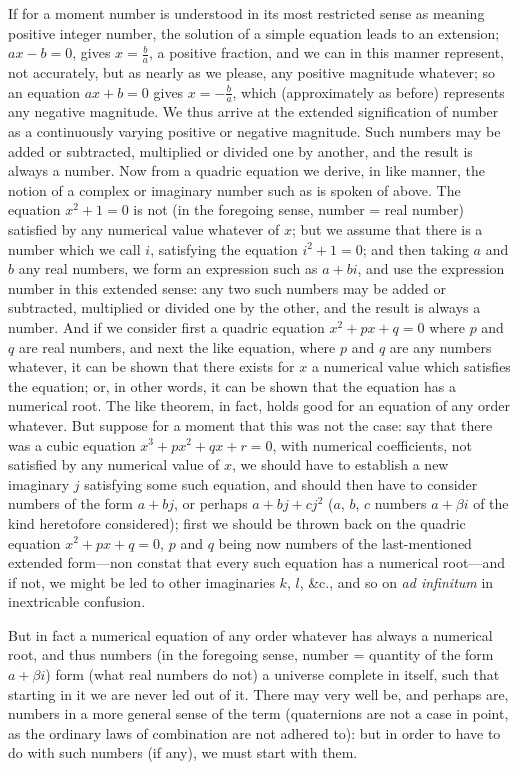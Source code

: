 \documentclass[11pt,a4paper]{book}
\begin{document}
If for a moment number is understood in its most restricted sense as meaning positive integer number, the solution of a simple equation leads to an extension; $ax - b = 0$, gives $x = \frac{b}{a}$, a positive fraction, and we can in this manner represent, not accurately, but as nearly as we please, any positive magnitude whatever; so an equation $ax + b = 0$ gives $x = -\frac{b}{a}$, which (approximately as before) represents any negative magnitude. We thus arrive at the extended signification of number as a continuously varying positive or negative magnitude. Such numbers may be added or subtracted, multiplied or divided one by another, and the result is always a number. Now from a quadric equation we derive, in like manner, the notion of a complex or imaginary number such as is spoken of above. The equation $x^{2} + 1 = 0$ is not (in the foregoing sense, number = real number) satisfied by any numerical value whatever of $x$; but we assume that there is a number which we call $i$, satisfying the equation $i^{2} + 1 = 0$; and then taking $a$ and $b$ any real numbers, we form an expression such as $a + bi$, and use the expression number in this extended sense: any two such numbers may be added or subtracted, multiplied or divided one by the other, and the result is always a number. And if we consider first a quadric equation $x^{2} + px + q = 0$ where $p$ and $q$ are real numbers, and next the like equation, where $p$ and $q$ are any numbers whatever, it can be shown that there exists for $x$ a numerical value which satisfies the equation; or, in other words, it can be shown that the equation has a numerical root. The like theorem, in fact, holds good for an equation of any order whatever. But suppose for a moment that this was not the case: say that there was a cubic equation $x^{3} + px^{2} + qx + r = 0$, with numerical coefficients, not satisfied by any numerical value of $x$, we should have to establish a new imaginary $j$ satisfying some such equation, and should then have to consider numbers of the form $a + bj$, or perhaps $a + bj + cj^{2}$ ($a$, $b$, $c$ numbers $a + \beta i$ of the kind heretofore considered); first we should be thrown back on the quadric equation $x^{2} + px + q = 0$, $p$ and $q$ being now numbers of the last-mentioned extended form---non constat that every such equation has a numerical root---and if not, we might be led to other imaginaries $k$, $l$, \&c., and so on \textit{ad infinitum} in inextricable confusion.

But in fact a numerical equation of any order whatever has always a numerical root, and thus numbers (in the foregoing sense, number = quantity of the form $a + \beta i$) form (what real numbers do not) a universe complete in itself, such that starting in it we are never led out of it. There may very well be, and perhaps are, numbers in a more general sense of the term (quaternions are not a case in point, as the ordinary laws of combination are not adhered to): but in order to have to do with such numbers (if any), we must start with them.
\end{document}
